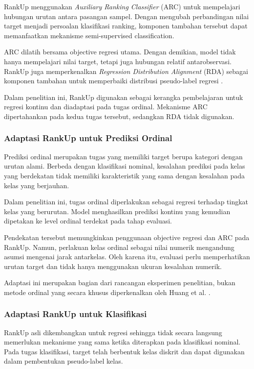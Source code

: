 RankUp menggunakan \textit{Auxiliary Ranking Classifier} (ARC) untuk mempelajari hubungan urutan antara pasangan sampel. Dengan mengubah perbandingan nilai target menjadi persoalan klasifikasi ranking, komponen tambahan tersebut dapat memanfaatkan mekanisme semi-supervised classification.

ARC dilatih bersama objective regresi utama. Dengan demikian, model tidak hanya mempelajari nilai target, tetapi juga hubungan relatif antarobservasi. RankUp juga memperkenalkan \textit{Regression Distribution Alignment} (RDA) sebagai komponen tambahan untuk memperbaiki distribusi pseudo-label regresi \cite{ref10}.

Dalam penelitian ini, RankUp digunakan sebagai kerangka pembelajaran untuk regresi kontinu dan diadaptasi pada tugas ordinal. Mekanisme ARC dipertahankan pada kedua tugas tersebut, sedangkan RDA tidak digunakan.

\subsubsection{Adaptasi RankUp untuk Prediksi Ordinal}

Prediksi ordinal merupakan tugas yang memiliki target berupa kategori dengan urutan alami. Berbeda dengan klasifikasi nominal, kesalahan prediksi pada kelas yang berdekatan tidak memiliki karakteristik yang sama dengan kesalahan pada kelas yang berjauhan.

Dalam penelitian ini, tugas ordinal diperlakukan sebagai regresi terhadap tingkat kelas yang berurutan. Model menghasilkan prediksi kontinu yang kemudian dipetakan ke level ordinal terdekat pada tahap evaluasi.

Pendekatan tersebut memungkinkan penggunaan objective regresi dan ARC pada RankUp. Namun, perlakuan kelas ordinal sebagai nilai numerik mengandung asumsi mengenai jarak antarkelas. Oleh karena itu, evaluasi perlu memperhatikan urutan target dan tidak hanya menggunakan ukuran kesalahan numerik.

Adaptasi ini merupakan bagian dari rancangan eksperimen penelitian, bukan metode ordinal yang secara khusus diperkenalkan oleh Huang et al. \cite{ref10}.

\subsubsection{Adaptasi RankUp untuk Klasifikasi}

RankUp asli dikembangkan untuk regresi sehingga tidak secara langsung memerlukan mekanisme yang sama ketika diterapkan pada klasifikasi nominal. Pada tugas klasifikasi, target telah berbentuk kelas diskrit dan dapat digunakan dalam pembentukan pseudo-label kelas.

